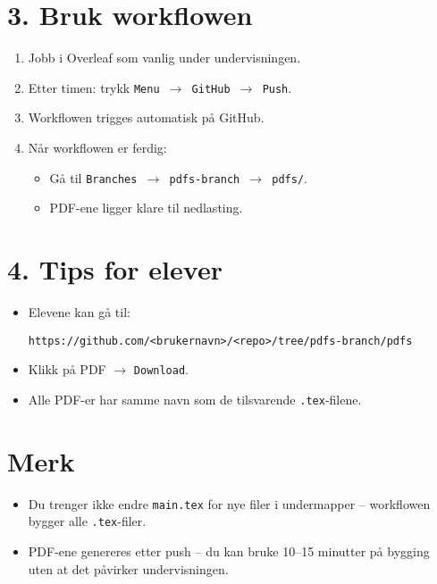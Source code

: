 \documentclass[a4paper,12pt]{article}
\begin{document}
\section*{3. Bruk workflowen}
\begin{enumerate}[label=\arabic*.]
    \item Jobb i Overleaf som vanlig under undervisningen.
    \item Etter timen: trykk \texttt{Menu $\to$ GitHub $\to$ Push}.
    \item Workflowen trigges automatisk på GitHub.
    \item Når workflowen er ferdig:
    \begin{itemize}
        \item Gå til \texttt{Branches $\to$ pdfs-branch $\to$ pdfs/}.
        \item PDF-ene ligger klare til nedlasting.
    \end{itemize}
\end{enumerate}

\section*{4. Tips for elever}
\begin{itemize}
    \item Elevene kan gå til:
    \begin{verbatim}
https://github.com/<brukernavn>/<repo>/tree/pdfs-branch/pdfs
    \end{verbatim}
    \item Klikk på PDF $\to$ \texttt{Download}.
    \item Alle PDF-er har samme navn som de tilsvarende \texttt{.tex}-filene.
\end{itemize}

\section*{Merk}
\begin{itemize}
    \item Du trenger ikke endre \texttt{main.tex} for nye filer i undermapper – workflowen bygger alle \texttt{.tex}-filer.
    \item PDF-ene genereres etter push – du kan bruke 10--15 minutter på bygging uten at det påvirker undervisningen.
\end{itemize}
\end{document}
